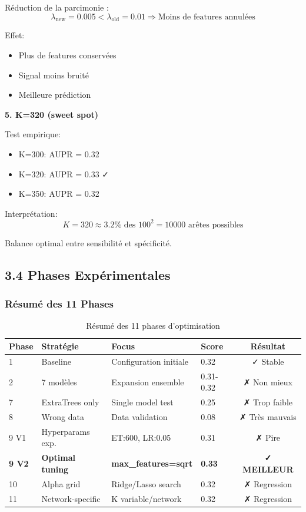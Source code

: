 \documentclass[12pt,a4paper,french]{article}
\begin{document}
Réduction de la parcimonie :
\begin{equation}
\lambda_{\text{new}} = 0.005 < \lambda_{\text{old}} = 0.01 \Rightarrow \text{Moins de features annulées}
\end{equation}

Effet:
\begin{itemize}
    \item Plus de features conservées
    \item Signal moins bruité
    \item Meilleure prédiction
\end{itemize}

\textbf{5. K=320 (sweet spot)}

Test empirique:
\begin{itemize}
    \item K=300: AUPR = 0.32
    \item K=320: AUPR = 0.33 ✓
    \item K=350: AUPR = 0.32
\end{itemize}

Interprétation:
\begin{equation}
K = 320 \approx 3.2\% \text{ des } 100^2 = 10000 \text{ arêtes possibles}
\end{equation}

Balance optimal entre sensibilité et spécificité.

\subsection{3.4 Phases Expérimentales}

\subsubsection{Résumé des 11 Phases}

\begin{table}[H]
\centering
\begin{tabular}{llllc}
\toprule
\textbf{Phase} & \textbf{Stratégie} & \textbf{Focus} & \textbf{Score} & \textbf{Résultat} \\
\midrule
1 & Baseline & Configuration initiale & 0.32 & ✓ Stable \\
2 & 7 modèles & Expansion ensemble & 0.31-0.32 & ✗ Non mieux \\
7 & ExtraTrees only & Single model test & 0.25 & ✗ Trop faible \\
8 & Wrong data & Data validation & 0.08 & ✗ Très mauvais \\
9 V1 & Hyperparams exp. & ET:600, LR:0.05 & 0.31 & ✗ Pire \\
\textbf{9 V2} & \textbf{Optimal tuning} & \textbf{max\_features=sqrt} & \textbf{0.33} & \textbf{✓ MEILLEUR} \\
10 & Alpha grid & Ridge/Lasso search & 0.32 & ✗ Regression \\
11 & Network-specific & K variable/network & 0.32 & ✗ Regression \\
\bottomrule
\end{tabular}
\caption{Résumé des 11 phases d'optimisation}
\end{table}
\end{document}
